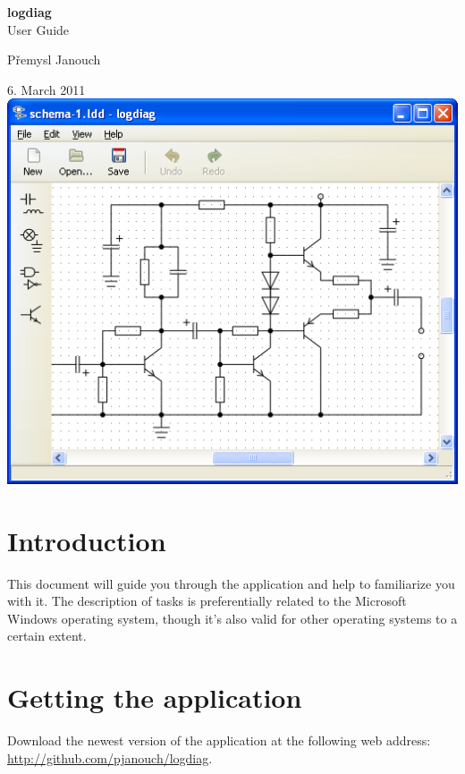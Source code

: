 \documentclass[12pt,oneside,a4paper,titlepage,final]{article}
\theoremstyle{note}
\newcommand{\gettitle}{logdiag}
\newcommand{\getsubtitle}{User Guide}
\newcommand{\getauthor}{Přemysl Janouch}
\newcommand{\getdate}{6. March 2011}
\begin{document}
\renewcommand{\thepage}{\roman{page}}

\thispagestyle{empty}

\begin{center}
	\doublespacing
	\textbf{\LARGE\gettitle}\\{\Large\getsubtitle}
	\par\getauthor
	\par\getdate
	\vfill
	\includegraphics{logdiag-en}
	\newpage
\end{center}

\tableofcontents
\newpage

\renewcommand{\thepage}{\arabic{page}}
\setcounter{page}{1}

\section{Introduction}
This document will guide you through the application and help to familiarize you with it. The description of tasks is preferentially related to the Microsoft Windows operating system, though it's also valid for other operating systems to a certain extent.

\section{Getting the application}
Download the newest version of the application at the following web address: \mbox{\url{http://github.com/pjanouch/logdiag}}.
\end{document}
